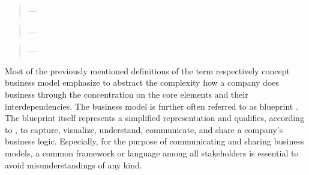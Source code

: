 \begin{quotation}\vspace*{-5pt}{\slshape 
[A business model is] a representation of a firm's underlying core logic and strategic choices for creating and capturing value within a value network.}
\vspace*{-7pt}
\begin{flushright}
	--- \citealp[p. 202]{Shafer2005}
\end{flushright}
\end{quotation}


\begin{quotation}\vspace*{-5pt}{\slshape 
A business model \ldots consists of four interlocking elements [customer value proposition, profit formula, key resources, and key processes] that, taken together, create and deliver value.}
\vspace*{-7pt}
\begin{flushright}
	--- \citealp[p. 52]{Johnson2008}
\end{flushright}
\end{quotation}

\begin{quotation}\vspace*{-5pt}{\slshape 
A business model describes the rationale of how an organization creates, delivers and captures value.}
\vspace*{-7pt}
\begin{flushright}
	--- \citealp[p. 14]{Osterwalder2010}
\end{flushright}
\end{quotation}

Most of the previously mentioned definitions of the term respectively concept business model emphasize to abstract the complexity how a company does business through the concentration on the core elements and their interdependencies. The business model is further often referred to as blueprint . The blueprint itself represents a simplified representation and qualifies, according to \citet[pp. 11-14]{Osterwalder2005}, to capture, visualize, understand, communicate, and share a company's business logic. Especially, for the purpose of communicating and sharing business models, a common framework or language among all stakeholders is essential to avoid misunderstandings of any kind.

